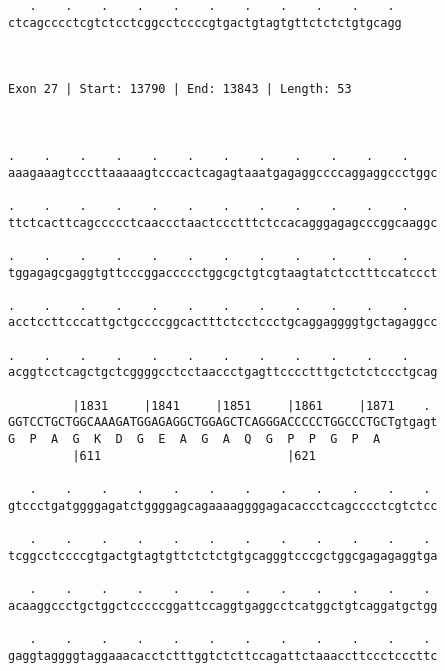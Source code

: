 \documentclass{article}
\begin{document}
\begin{Verbatim}
   .    .    .    .    .    .    .    .    .    .    . 
ctcagcccctcgtctcctcggcctccccgtgactgtagtgttctctctgtgcagg
                                                       
                                                       
 
Exon 27 | Start: 13790 | End: 13843 | Length: 53



.    .    .    .    .    .    .    .    .    .    .    .    
aaagaaagtcccttaaaaagtcccactcagagtaaatgagaggccccaggaggccctggc
                                                            
.    .    .    .    .    .    .    .    .    .    .    .    
ttctcacttcagccccctcaaccctaactccctttctccacagggagagcccggcaaggc
                                                            
.    .    .    .    .    .    .    .    .    .    .    .    
tggagagcgaggtgttcccggaccccctggcgctgtcgtaagtatctcctttccatccct
                                                            
.    .    .    .    .    .    .    .    .    .    .    .    
acctccttcccattgctgccccggcactttctcctccctgcaggaggggtgctagaggcc
                                                            
.    .    .    .    .    .    .    .    .    .    .    .    
acggtcctcagctgctcggggcctcctaaccctgagttcccctttgctctctccctgcag
                                                            
         |1831     |1841     |1851     |1861     |1871    . 
GGTCCTGCTGGCAAAGATGGAGAGGCTGGAGCTCAGGGACCCCCTGGCCCTGCTgtgagt
G  P  A  G  K  D  G  E  A  G  A  Q  G  P  P  G  P  A        
         |611                          |621                 
  
   .    .    .    .    .    .    .    .    .    .    .    . 
gtccctgatggggagatctggggagcagaaaaggggagacaccctcagcccctcgtctcc
                                                            
   .    .    .    .    .    .    .    .    .    .    .    . 
tcggcctccccgtgactgtagtgttctctctgtgcagggtcccgctggcgagagaggtga
                                                            
   .    .    .    .    .    .    .    .    .    .    .    . 
acaaggccctgctggctcccccggattccaggtgaggcctcatggctgtcaggatgctgg
                                                            
   .    .    .    .    .    .    .    .    .    .    .    . 
gaggtaggggtaggaaacacctctttggtctcttccagattctaaaccttccctcccttc
                                                            

\end{Verbatim}
\end{document}

